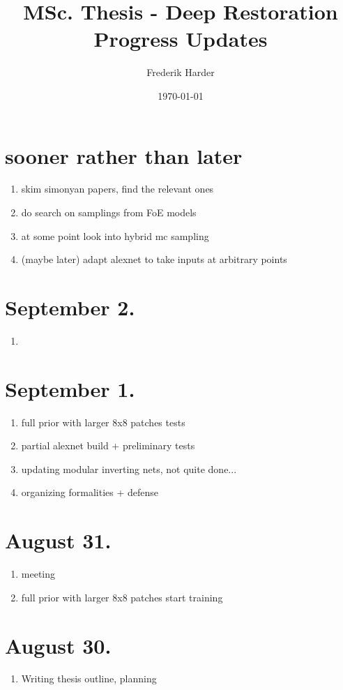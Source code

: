 \documentclass{article}
\title{MSc. Thesis - Deep Restoration\\Progress Updates}
\date{\today}
\author{Frederik Harder}
\begin{document}
\maketitle

\section*{sooner rather than later}

\begin{enumerate}
	\item skim simonyan papers, find the relevant ones
	\item do search on samplings from FoE models
	\item at some point look into hybrid mc sampling
	\item (maybe later) adapt alexnet to take inputs at arbitrary points
\end{enumerate}

\section{September 2.}
\begin{enumerate}
	\item 
\end{enumerate}

\section{September 1.}
\begin{enumerate}
	\item full prior with larger 8x8 patches tests
	\item partial alexnet build + preliminary tests
	\item updating modular inverting nets, not quite done...
	\item organizing formalities + defense
\end{enumerate}


\section{August 31.}
\begin{enumerate}
	\item meeting
	\item full prior with larger 8x8 patches start training
\end{enumerate}

\section{August 30.}
\begin{enumerate}
	\item Writing thesis outline, planning
\end{enumerate}
\end{document}
